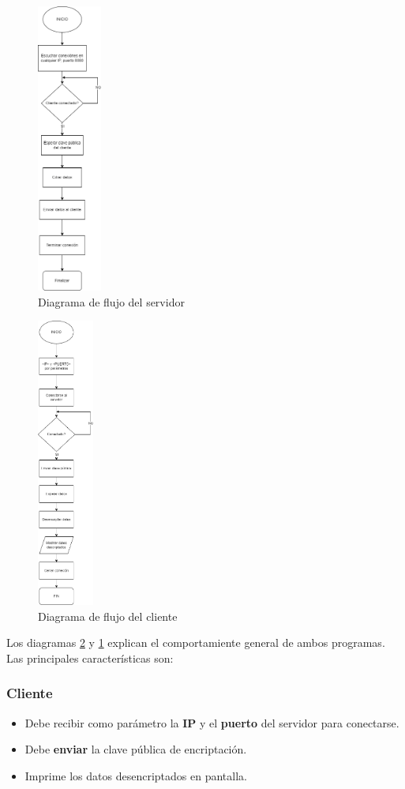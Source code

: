 \documentclass[letterpaper, 10 pt, conference]{ieeeconf}  %
\begin{document}
\begin{figure}[H]
	\centering
	\includegraphics[height=270pt]{./Imagenes/diagrama_flujo_server.png}
	\caption{Diagrama de flujo del servidor}
	\label{fig:flujo_server}
\end{figure}

\begin{figure}[H]
	\centering
	\includegraphics[height=270pt]{./Imagenes/diag_flujo_cliente.png}
	\caption{Diagrama de flujo del cliente}
	\label{fig:flujo_cliente}
\end{figure}

Los diagramas \ref{fig:flujo_cliente} y \ref{fig:flujo_server} explican el comportamiente general de ambos programas. Las principales características son:

\subsubsection{Cliente}
\begin{itemize}
	\item Debe recibir como parámetro la \textbf{IP} y el \textbf{puerto} del servidor para conectarse.
	\item Debe \textbf{enviar} la clave pública de encriptación.
	\item Imprime los datos desencriptados en pantalla.
\end{itemize}
\end{document}
